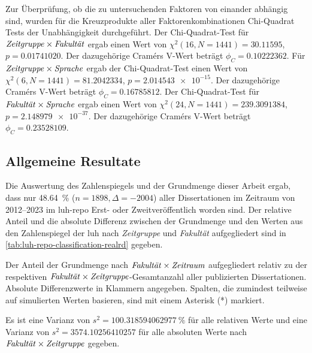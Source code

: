 Zur Überprüfung, ob die zu untersuchenden Faktoren von einander abhängig sind, wurden für die Kreuzprodukte aller Faktorenkombinationen Chi-Quadrat Tests der Unabhängigkeit durchgeführt.
Der Chi-Quadrat-Test für $\text{\textit{Zeitgruppe}}\times\text{\textit{Fakultät}}$ ergab einen Wert von $\chi^2 (\num{16}, N = \num{1441}) = \num[round-mode=places,round-precision=3]{30.11595}$, $p = \num[round-mode=places,round-precision=3]{0.01741020}$.
Der dazugehörige Cramérs V-Wert beträgt $\phi_C=\num[round-mode=places,round-precision=3]{0.10222362}$.
Für $\text{\textit{Zeitgruppe}}\times\text{\textit{Sprache}}$ ergab der Chi-Quadrat-Test einen Wert von $\chi^2 (\num{6}, N = \num{1441}) = \num[round-mode=places,round-precision=3]{81.2042334}$, $p = \num[round-mode=places,round-precision=3]{2.014543e-15}$.
Der dazugehörige Cramérs V-Wert beträgt $\phi_C=\num[round-mode=places,round-precision=3]{0.16785812}$.
Der Chi-Quadrat-Test für $\text{\textit{Fakultät}}\times\text{\textit{Sprache}}$ ergab einen Wert von $\chi^2 (\num{24}, N = \num{1441}) = \num[round-mode=places,round-precision=3]{239.3091384}$, $p = \num[round-mode=places,round-precision=3]{2.148979e-37}$.
Der dazugehörige Cramérs V-Wert beträgt $\phi_C=\num[round-mode=places,round-precision=3]{0.23528109}$.


\subsection{Allgemeine Resultate}\label{sec:luh-repo-results-general}
Die Auswertung des Zahlenspiegels und der Grundmenge dieser Arbeit ergab, dass nur \SI{48,64}{\percent} ($n=\num{1898},\Delta=\num{-2004}$) aller Dissertationen im Zeitraum von 2012--2023 im \gls{luh-repo} Erst- oder Zweitveröffentlich worden sind.
Der relative Anteil und die absolute Differenz zwischen der Grundmenge und den Werten aus den Zahlenspiegel der \gls{luh} nach \textit{Zeitgruppe} und \textit{Fakultät} aufgegliedert sind in \cref{tab:luh-repo-classification-realrd} gegeben.
\begin{table}[!htbp]
	\caption{Der Anteil der Grundmenge nach $\text{\textit{Fakultät}}\times\text{\textit{Zeitraum}}$ aufgegliedert relativ zu der respektiven $\text{\textit{Fakultät}}\times\text{\textit{Zeitgruppe}}$-Gesamtanzahl aller publizierten Dissertationen.
    Absolute Differenzwerte in Klammern angegeben.
    Spalten, die zumindest teilweise auf simulierten Werten basieren, sind mit einem Asterisk (*) markiert.}
    
    \label{tab:luh-repo-zahlenspiegel-relative-grundmenge}
\end{table}
Es ist eine Varianz von $s^2=\SI[round-mode=places,round-precision=3]{100.318594062977}{\percent}$ für alle relativen Werte und eine Varianz von $s^2=\num[round-mode=places,round-precision=3]{3574.10256410257}$ für alle absoluten Werte nach $\text{\textit{Fakultät}}\times\text{\textit{Zeitgruppe}}$ gegeben.

